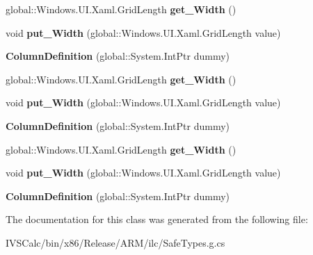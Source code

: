 \begin{DoxyCompactItemize}
global\+::\+Windows.\+U\+I.\+Xaml.\+Grid\+Length {\bfseries get\+\_\+\+Width} ()
\item 
\mbox{\label{class_windows_1_1_u_i_1_1_xaml_1_1_controls_1_1_column_definition_a8e843acc7b6d11dfc088c65cd1855d52}} 
void {\bfseries put\+\_\+\+Width} (global\+::\+Windows.\+U\+I.\+Xaml.\+Grid\+Length value)
\item 
\mbox{\label{class_windows_1_1_u_i_1_1_xaml_1_1_controls_1_1_column_definition_aaedeeb407ba2854b1fe9e2cdbfb853ba}} 
{\bfseries Column\+Definition} (global\+::\+System.\+Int\+Ptr dummy)
\item 
\mbox{\label{class_windows_1_1_u_i_1_1_xaml_1_1_controls_1_1_column_definition_a7446b8f3d6ddf433eeff2a049acff1c8}} 
global\+::\+Windows.\+U\+I.\+Xaml.\+Grid\+Length {\bfseries get\+\_\+\+Width} ()
\item 
\mbox{\label{class_windows_1_1_u_i_1_1_xaml_1_1_controls_1_1_column_definition_a8e843acc7b6d11dfc088c65cd1855d52}} 
void {\bfseries put\+\_\+\+Width} (global\+::\+Windows.\+U\+I.\+Xaml.\+Grid\+Length value)
\item 
\mbox{\label{class_windows_1_1_u_i_1_1_xaml_1_1_controls_1_1_column_definition_aaedeeb407ba2854b1fe9e2cdbfb853ba}} 
{\bfseries Column\+Definition} (global\+::\+System.\+Int\+Ptr dummy)
\item 
\mbox{\label{class_windows_1_1_u_i_1_1_xaml_1_1_controls_1_1_column_definition_a7446b8f3d6ddf433eeff2a049acff1c8}} 
global\+::\+Windows.\+U\+I.\+Xaml.\+Grid\+Length {\bfseries get\+\_\+\+Width} ()
\item 
\mbox{\label{class_windows_1_1_u_i_1_1_xaml_1_1_controls_1_1_column_definition_a8e843acc7b6d11dfc088c65cd1855d52}} 
void {\bfseries put\+\_\+\+Width} (global\+::\+Windows.\+U\+I.\+Xaml.\+Grid\+Length value)
\item 
\mbox{\label{class_windows_1_1_u_i_1_1_xaml_1_1_controls_1_1_column_definition_aaedeeb407ba2854b1fe9e2cdbfb853ba}} 
{\bfseries Column\+Definition} (global\+::\+System.\+Int\+Ptr dummy)
\end{DoxyCompactItemize}


The documentation for this class was generated from the following file\+:\begin{DoxyCompactItemize}
\item 
I\+V\+S\+Calc/bin/x86/\+Release/\+A\+R\+M/ilc/Safe\+Types.\+g.\+cs\end{DoxyCompactItemize}
